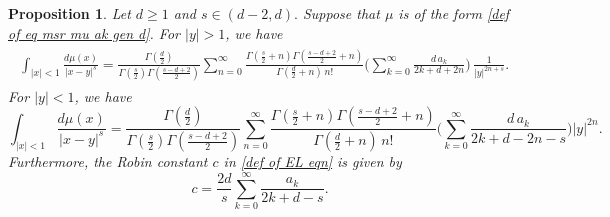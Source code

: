 \documentclass[10pt]{amsart}
\theoremstyle{plain}
\newtheorem{prop}[thm]{Proposition}
\theoremstyle{remark}
\numberwithin{equation}{section}
\begin{document}
\begin{prop}  \label{Prop_evaulation of the EL conditions} Let $d \ge 1$ and $s \in (d-2,d).$
Suppose that $\mu$ is of the form \eqref{def of eq msr mu ak gen d}.  
For $|y|>1$, we have 
\begin{align}
\begin{split}
 \int_{ |x|<1 } \frac{ d\mu(x) }{ |x-y|^s } = \frac{ \Gamma( \frac{d}{2} ) }{ \Gamma(\frac{s}{2}) \Gamma( \frac{s-d+2}{2} )  }    \sum_{n=0}^\infty \frac{ \Gamma(\frac{s}{2}+n) \Gamma( \frac{s-d+2}{2}+n )  }{ \Gamma(\frac{d}{2}+n) \, n! }  \bigg( \sum_{k=0}^\infty \frac{d\,a_k}{2k+d+2n} \bigg) \, \frac{1}{|y|^{2n+s}}. 
\end{split}
\end{align} 
For $|y|<1$, we have 
\begin{equation}\label{2.20}
 \int_{ |x| <1 } \frac{ d\mu(x)  }{  |x-y|^s }=   \frac{ \Gamma( \frac{d}{2} ) }{ \Gamma(\frac{s}{2}) \Gamma( \frac{s-d+2}{2} )  }   \sum_{n=0}^\infty \frac{ \Gamma(\frac{s}{2}+n) \Gamma( \frac{s-d+2}{2}+n )  }{ \Gamma(\frac{d}{2}+n) \, n! } \bigg( \sum_{k=0}^\infty \frac{d\,a_k}{ 2k+d-2n-s } \bigg) |y|^{2n} .
\end{equation} 
Furthermore, the Robin constant $c$ in \eqref{def of EL eqn} is given by
\begin{equation}
c=    \frac{ 2d }{ s }    \sum_{k=0}^\infty \frac{a_k}{ 2k+d-s }  . 
\end{equation}  
\end{prop}
\end{document}
